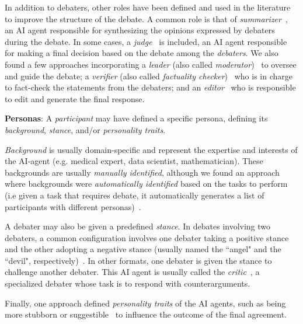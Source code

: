 \documentclass[conference]{IEEEtran}
\begin{document}
In addition to debaters, other roles have been defined and used in the literature to improve the structure of the debate. A common role is that of  \textit{summarizer}~\cite{p17-wang-2025, p20-Jeptoo-2025, p21-wang-2024,p26-li-2024, p28-chan-2024, s05-wang-2024,s11-Yu-He-2024}, an AI agent responsible for synthesizing the opinions expressed by debaters during the debate. In some cases, a \textit{judge}~\cite{p02-fang-2025,p04-liang-2024,p09-lim-2024, p20-Jeptoo-2025, p21-wang-2024, p26-li-2024, s05-wang-2024,s11-Yu-He-2024, s12-xiong-2023, s24-wang-2024} is included, an AI agent responsible for making a final decision based on the debate among the \textit{debaters}. We also found a few approaches incorporating a \textit{leader} (also called  \textit{moderator})~\cite{p11-Huang-2024, p17-wang-2025,s11-Yu-He-2024, s29-wang-2024} to oversee and guide the debate; a \textit{verifier} (also called  \textit{factuality checker})~\cite{s09-yang-2024, s27-Zhu-2023} who is in charge to fact-check the statements from the debaters; and an \textit{editor}~\cite{p26-li-2024} who is responsible to edit and generate the final response.

\textbf{Personas}: 
A \textit{participant} may have defined a specific persona, defining its \textit{background}, \textit{stance}, and/or \textit{personality traits}. 

\textit{Background} is usually domain-specific and represent the expertise and interests of the AI-agent (e.g. medical expert, data scientist, mathematician).   
These backgrounds are usually \textit{manually identified}, although we found an approach where backgrounds were \textit{automatically identified} based on the tasks to perform (i.e given a task that requires debate, it automatically generates a list of participants with different personas)~\cite{s29-wang-2024}.


A debater may also be given a predefined \textit{stance}. In debates involving two debaters, a common configuration involves one debater taking a positive stance and the other adopting a negative stance (usually named the ``angel" and the ``devil", respectively)~\cite{p04-liang-2024,p26-li-2024}.
In other formats, one debater is given the stance to challenge another debater. This AI agent is usually called the \textit{critic}~\cite{p02-fang-2025, p21-wang-2024}, a specialized debater whose task is to respond with counterarguments. 

Finally, one approach defined \textit{personality traits} of the AI agents, such as being more stubborn or suggestible~\cite{s18-chen-2025} to influence the outcome of the final agreement. 
\end{document}
